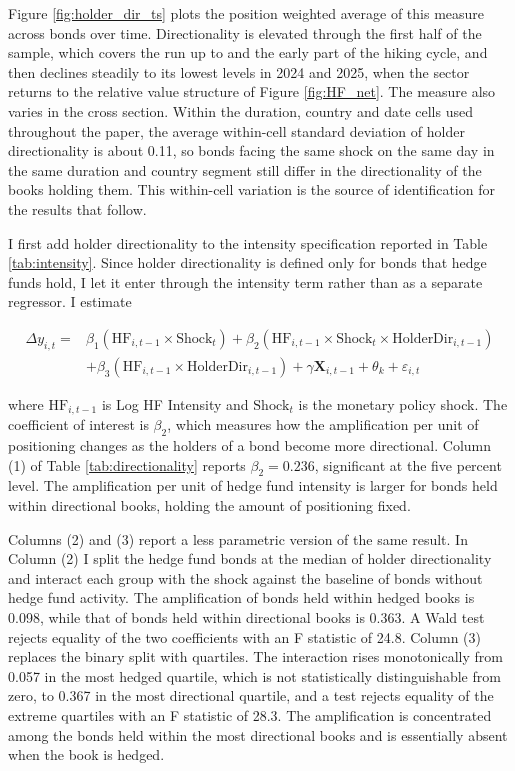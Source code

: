 \documentclass[english, 11pt, oneside]{article}
\begin{document}
Figure \ref{fig:holder_dir_ts} plots the position weighted average of this measure across bonds over time. Directionality is elevated through the first half of the sample, which covers the run up to and the early part of the hiking cycle, and then declines steadily to its lowest levels in 2024 and 2025, when the sector returns to the relative value structure of Figure \ref{fig:HF_net}. The measure also varies in the cross section. Within the duration, country and date cells used throughout the paper, the average within-cell standard deviation of holder directionality is about 0.11, so bonds facing the same shock on the same day in the same duration and country segment still differ in the directionality of the books holding them. This within-cell variation is the source of identification for the results that follow.

I first add holder directionality to the intensity specification reported in Table \ref{tab:intensity}. Since holder directionality is defined only for bonds that hedge funds hold, I let it enter through the intensity term rather than as a separate regressor. I estimate

\begin{equation}
\begin{split}
\Delta y_{i,t} = {} & \beta_1 (\text{HF}_{i,t-1} \times \text{Shock}_{t}) + \beta_2 (\text{HF}_{i,t-1} \times \text{Shock}_{t} \times \text{HolderDir}_{i,t-1}) \\
& + \beta_3 (\text{HF}_{i,t-1} \times \text{HolderDir}_{i,t-1}) + \gamma \mathbf{X}_{i,t-1} + \theta_{k} + \varepsilon_{i,t}
\end{split}
\end{equation}

\noindent where $\text{HF}_{i,t-1}$ is Log HF Intensity and $\text{Shock}_{t}$ is the monetary policy shock. The coefficient of interest is $\beta_2$, which measures how the amplification per unit of positioning changes as the holders of a bond become more directional. Column (1) of Table \ref{tab:directionality} reports $\beta_2 = 0.236$, significant at the five percent level. The amplification per unit of hedge fund intensity is larger for bonds held within directional books, holding the amount of positioning fixed.

Columns (2) and (3) report a less parametric version of the same result. In Column (2) I split the hedge fund bonds at the median of holder directionality and interact each group with the shock against the baseline of bonds without hedge fund activity. The amplification of bonds held within hedged books is 0.098, while that of bonds held within directional books is 0.363. A Wald test rejects equality of the two coefficients with an F statistic of 24.8. Column (3) replaces the binary split with quartiles. The interaction rises monotonically from 0.057 in the most hedged quartile, which is not statistically distinguishable from zero, to 0.367 in the most directional quartile, and a test rejects equality of the extreme quartiles with an F statistic of 28.3. The amplification is concentrated among the bonds held within the most directional books and is essentially absent when the book is hedged.
\end{document}
